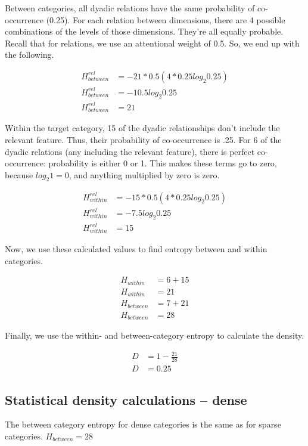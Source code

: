 \documentclass[../dissertation.tex]{subfiles}
\begin{document}
Between categories, all dyadic relations have the same probability of co-occurrence (0.25). For each relation between dimensions, there are 4 possible combinations of the levels of those dimensions. They're all equally probable. Recall that for relations, we use an attentional weight of 0.5. So, we end up with the following.

\begin{align*}
H^{rel}_{between} &= -21 * 0.5(4 * 0.25log_{2}0.25)\\
H^{rel}_{between} &= -10.5log_{2}0.25\\
H^{rel}_{between} &= 21
\end{align*}

Within the target category, 15 of the dyadic relationships don't include the relevant feature. Thus, their probability of co-occurrence is .25. For 6 of the dyadic relations (any including the relevant feature), there is perfect co-occurrence: probability is either 0 or 1. This makes these terms go to zero, because $log_{2}1 = 0$, and anything multiplied by zero is zero.

\begin{align*}
H^{rel}_{within} &= -15 * 0.5(4 * 0.25log_{2}0.25)\\
H^{rel}_{within} &= -7.5log_{2}0.25\\
H^{rel}_{within} &= 15
\end{align*}

Now, we use these calculated values to find entropy between and within categories.

\begin{align*}
H_{within} &= 6 + 15\\
H_{within} &= 21\\
H_{between} &= 7 + 21\\
H_{between} &= 28
\end{align*}

Finally, we use the within- and between-category entropy to calculate the density.

\begin{align*}
D &= 1 - \frac{21}{28}\\
D &= 0.25
\end{align*}

\subsection{Statistical density calculations -- dense}

The between category entropy for dense categories is the same as for sparse categories. $H_{between} = 28$ \newline
\end{document}
